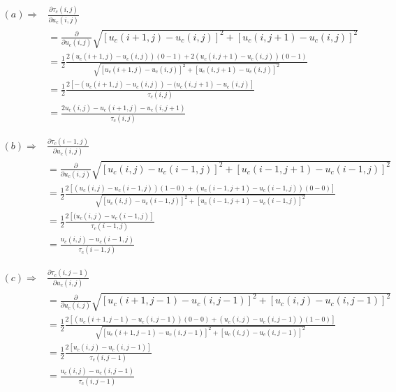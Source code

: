 \documentclass{paper}
\begin{document}
\begin{align}
	(a) \Longrightarrow
	& \frac{\partial{\tau_{c}\left(i,j\right)}}{\partial u_{c}\left(i,j\right)} \nonumber \\
	&= \frac{\partial}{\partial{u_{c}\left(i,j\right)}} \sqrt{ \left[u_{c}(i+1,j) - u_{c}(i,j)\right]^2 + \left[u_{c}(i,j+1) - u_{c}(i,j)\right]^2} \nonumber \\
	&= \frac{1}{2} \frac{2 (u_{c}(i+1,j)-u_{c}(i,j))(0-1) + 2 (u_{c}(i,j+1)-u_{c}(i,j))(0-1)}{\sqrt{ \left[u_{c}(i+1,j) - u_{c}(i,j)\right]^2 + \left[u_{c}(i,j+1) - u_{c}(i,j)\right]^2}} \nonumber \\
	&= \frac{1}{2} \frac{2 [-(u_{c}(i+1,j)-u_{c}(i,j)) - (u_{c}(i,j+1)-u_{c}(i,j)]}{\tau_{c}\left(i,j\right)} \nonumber \\
	&= \frac{2 u_{c} \left(i,j\right) - u_{c} \left(i+1,j\right)-u_{c} \left(i,j+1\right)}{\tau_{c}\left(i,j\right)}
\label{eq:a_term}	
\end{align}

\begin{align}
(b) \Longrightarrow
	& \frac{\partial{\tau_{c}\left(i-1,j\right)}}{\partial u_{c}\left(i,j\right)} \nonumber \\
	&= \frac{\partial}{\partial{u_{c}\left(i,j\right)}} \sqrt{ \left[u_{c}(i,j) - u_{c}(i-1,j)\right]^2 + \left[u_{c}(i-1,j+1) - u_{c}(i-1,j)\right]^2} \nonumber \\
	&= \frac{1}{2} \frac{2[\left(u_{c}(i,j) - u_{c}(i-1,j)\right)(1-0) + \left(u_{c}(i-1,j+1) - u_{c}(i-1,j)\right)(0-0)]}{\sqrt{ \left[u_{c}(i,j) - u_{c}(i-1,j)\right]^2 + \left[u_{c}(i-1,j+1) - u_{c}(i-1,j)\right]^2}} \nonumber \\
	&= \frac{1}{2} \frac{2\left[(u_{c}(i,j) - u_{c}(i-1,j)\right]}{\tau_{c}\left(i-1,j\right)} \nonumber \\
	&= \frac{u_{c}\left(i,j\right) - u_{c}\left(i-1,j\right)}{\tau_{c}\left(i-1,j\right)}
\label{eq:b_term}	
\end{align}

\begin{align}
(c) \Longrightarrow
	& \frac{\partial{\tau_{c}\left(i,j-1\right)}}{\partial u_{c}\left(i,j\right)} \nonumber \\
	&= \frac{\partial}{\partial{u_{c}\left(i,j\right)}} \sqrt{ \left[u_{c}(i+1,j-1)-u_{c}(i,j-1)\right]^2 + \left[u_{c}(i,j) - u_{c}(i,j-1)\right]^2} \nonumber \\
	&=  \frac{1}{2} \frac{2 [\left(u_{c}(i+1,j-1)-u_{c}(i,j-1)\right)(0 - 0) + \left(u_{c}(i,j) - u_{c}(i,j-1)\right)(1-0)]}{\sqrt{ \left[u_{c}(i+1,j-1)-u_{c}(i,j-1)\right]^2 + \left[u_{c}(i,j) - u_{c}(i,j-1)\right]^2}} \nonumber \\
	&= \frac{1}{2} \frac{2 \left[u_{c}(i,j)- u_{c} (i,j-1)\right] }{\tau_{c}\left(i,j-1\right)} \nonumber \\			
	&= \frac{u_{c}(i,j)-u_{c} \left(i,j-1\right)}{\tau_{c}\left(i,j-1\right)}
\label{eq:c_term}	
\end{align}
\end{document}
